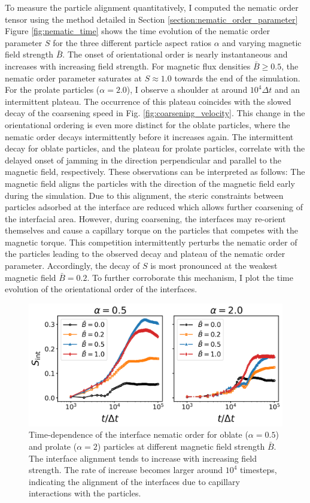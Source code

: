 To measure the particle alignment quantitatively, I computed the
nematic order tensor using the method detailed in Section \ref{section:nematic_order_parameter} 
Figure \ref{fig:nematic_time} shows the time evolution of the nematic
order parameter \(S\) for the three different particle aspect ratios
\(\alpha\) and varying magnetic field strength \(\bar{B}\). The onset of
orientational order is nearly instantaneous and increases with
increasing field strength. For magnetic flux densities
\(\bar{B}\ge0.5\), the nematic order parameter saturates at
\(S\approx 1.0\) towards the end of the simulation. For the prolate
particles (\(\alpha=2.0\)), I observe a shoulder at around
\(10^4\Delta t\) and an intermittent plateau. The occurrence of this
plateau coincides with the slowed decay of the coarsening speed in Fig.
\ref{fig:coarsening_velocity}. This change in the orientational ordering
is even more distinct for the oblate particles, where the nematic order
decays intermittently before it increases again. The intermittent decay
for oblate particles, and the plateau for prolate particles, correlate
with the delayed onset of jamming in the direction perpendicular and
parallel to the magnetic field, respectively. These observations can be
interpreted as follows: The magnetic field aligns the particles with the
direction of the magnetic field early during the simulation. Due to this
alignment, the steric constraints between particles adsorbed at the
interface are reduced which allows further coarsening of the interfacial
area. However, during coarsening, the interfaces may re-orient
themselves and cause a capillary torque on the particles that competes
with the magnetic torque. This competition intermittently perturbs the
nematic order of the particles leading to the observed decay and plateau
of the nematic order parameter. Accordingly, the decay of \(S\) is most
pronounced at the weakest magnetic field \(\bar{B}=0.2\). To further corroborate 
this mechanism, I plot the time evolution of the orientational order of the interfaces. 

\begin{figure}
\centering
\includegraphics[scale = 0.4]{figures/results/paper1/interface_nematic.png}
\caption{Time-dependence of the interface nematic order for oblate ($\alpha=0.5$) and prolate ($\alpha=2$) particles at different magnetic field strength $\bar{B}$. The interface alignment tends to increase with increasing field strength. The rate of increase becomes larger around $10^4$ timesteps, indicating the alignment of the interfaces due to capillary interactions with the particles.}
\label{fig:interface_nematic}
\end{figure}

